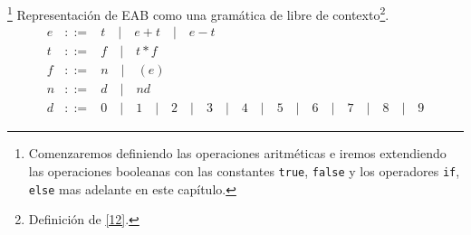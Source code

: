 \begin{definition}\footnote{Comenzaremos definiendo las operaciones aritméticas e iremos extendiendo las operaciones booleanas con las constantes \texttt{true}, \texttt{false} y los operadores \texttt{if}, \texttt{else} mas adelante en este capítulo.}  Representación de \textsf{EAB} como una gramática de libre de contexto\footnote{Definición de \hyperlink{12}{[12]}.}.
    \[
    \begin{array}{rll}
        e & ::= & t \quad |\quad e + t \quad  | \quad e - t\\
        t & ::= & f \quad |\quad t * f \\
        f & ::= & n \quad |\quad (e)\\
        n & ::= & d \quad |\quad nd \\
        d & ::= & 0 \quad |\quad 1 \quad |\quad 2 \quad |\quad 3 \quad |\quad 4 \quad |\quad 5 \quad |\quad 6 \quad |\quad 7 \quad |\quad 8 \quad |\quad 9 
    \end{array}
    \]

\end{definition}
    

     
